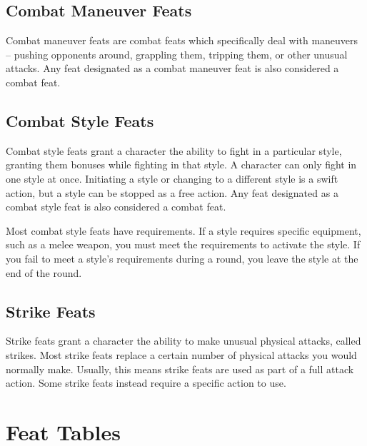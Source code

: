 \subsection{Combat Maneuver Feats}
Combat maneuver feats are combat feats which specifically deal with maneuvers -- pushing opponents around, grappling them, tripping them, or other unusual attacks.
Any feat designated as a combat maneuver feat is also considered a combat feat.

\subsection{Combat Style Feats}
Combat style feats grant a character the ability to fight in a particular style, granting them bonuses while fighting in that style.
A character can only fight in one style at once.
Initiating a style or changing to a different style is a swift action, but a style can be stopped as a free action.
Any feat designated as a combat style feat is also considered a combat feat.

Most combat style feats have requirements.
If a style requires specific equipment, such as a melee weapon, you must meet the requirements to activate the style.
If you fail to meet a style's requirements during a round, you leave the style at the end of the round.

\subsection{Strike Feats}\label{Strike Feats}
Strike feats grant a character the ability to make unusual physical attacks, called strikes.
Most strike feats replace a certain number of physical attacks you would normally make.
Usually, this means strike feats are used as part of a full attack action.
Some strike feats instead require a specific action to use.

\section{Feat Tables}
\onecolumn

